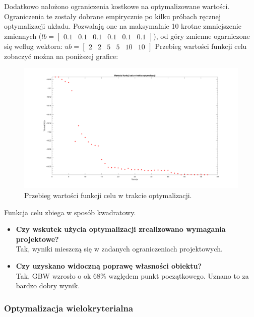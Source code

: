 \documentclass{article}
\begin{document}
Dodatkowo nałożono ograniczenia kostkowe na optymalizowane wartości. Ograniczenia te zostały dobrane empirycznie po kilku próbach ręcznej optymalizacji układu.
Pozwalają one na maksymalnie 10 krotne zmniejszenie zmiennych ($ lb= \begin{bmatrix} 0.1 & 0.1& 0.1 & 0.1  & 0.1 & 0.1  \end{bmatrix} $), od góry zmienne ogarniczone się weflug wektora: $ ub= \begin{bmatrix} 2 & 2 & 5 & 5  & 10 & 10  \end{bmatrix} $
\pagebreak
Przebieg wartości funkcji celu zobaczyć można na poniższej grafice:
\begin{figure}[h]
    \includegraphics[width=12cm]{graphics/fval.png}
    \centering
    \caption{Przebieg wartości funkcji celu w trakcie optymalizacji.}
\end{figure}
Funkcja celu zbiega w sposób kwadratowy.

\begin{itemize}
    \item \textbf{Czy wskutek użycia optymalizacji zrealizowano wymagania projektowe?}\\
          Tak, wyniki mieszczą się w zadanych ograniczeniach projektowych.
    \item \textbf{Czy uzyskano widoczną poprawę własności obiektu?}\\
          Tak, GBW wzrosło o ok 68\% względem punkt początkowego. Uznano to za bardzo dobry wynik.
\end{itemize}
\subsubsection{Optymalizacja wielokryterialna}
\end{document}
